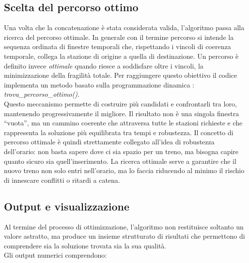 \documentclass[a4paper,12pt]{report}
\begin{document}
\subsection{Scelta del percorso ottimo}
Una volta che la concatenazione è stata considerata valida, l’algoritmo passa alla ricerca del percorso ottimale.
In generale con il termine percorso si intende la sequenza ordinata di finestre temporali che, rispettando i vincoli di coerenza temporale, collega la stazione di origine a quella di destinazione.
Un percorso è definito invece \textit{ottimale} quando riesce a soddisfare oltre i vincoli, la minimizzazione della fragilità totale.
Per raggiungere questo obiettivo il codice implementa un metodo basato sulla programmazione dinamica : \textit{trova\_percorso\_ottimo()}. \\
Questo meccanismo permette di costruire più candidati e confrontarli tra loro, mantenendo progressivamente il migliore. Il risultato non è una singola finestra “vuota”, ma un cammino coerente che attraversa tutte le stazioni richieste e che rappresenta la soluzione più equilibrata tra tempi e robustezza.
Il concetto di percorso ottimale è quindi strettamente collegato all’idea di robustezza dell’orario: non basta sapere dove ci sia spazio per un treno, ma bisogna capire quanto sicuro sia quell’inserimento. La ricerca ottimale serve a garantire che il nuovo treno non solo entri nell’orario, ma lo faccia riducendo al minimo il rischio di innescare conflitti o ritardi a catena.

\subsection{Output e visualizzazione}
Al termine del processo di ottimizzazione, l’algoritmo non restituisce soltanto un valore astratto, ma produce un insieme strutturato di risultati che permettono di comprendere sia la soluzione trovata sia la sua qualità. \\ Gli output numerici comprendono:
\end{document}
